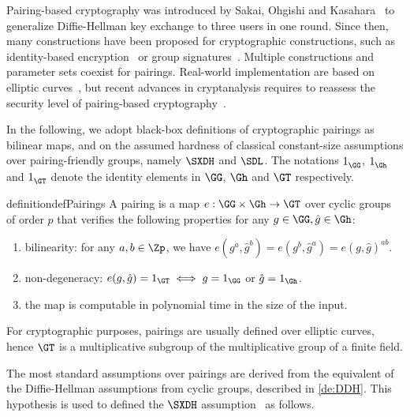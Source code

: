 
Pairing-based cryptography was introduced by Sakai, Ohgishi and Kasahara~\cite{SOK00} to generalize Diffie-Hellman key exchange to three users in one round.
Since then, many constructions have been proposed for cryptographic constructions, such as identity-based encryption~\cite{BF01,Wat05} or group signatures~\cite{BBS04}.
Multiple constructions and parameter sets coexist for pairings.
Real-world implementation are based on elliptic curves~\cite{BN06, KSS08}, but recent advances in cryptanalysis requires to reassess the security level of pairing-based cryptography~\cite{KB16,MSS17,BD18}.

In the following, we adopt black-box definitions of cryptographic pairings as bilinear maps, and on the assumed hardness of classical constant-size assumptions over pairing-friendly groups, namely $\SXDH$ and $\SDL$.
The notations $1_{\GG}^{}$, $1_{\Gh}^{}$ and $1_{\GT}^{}$ denote the identity elements in $\GG$, $\Gh$ and $\GT$ respectively.

\begin{restatable}{definition}{defPairings} \label{de:pairings} 
  A pairing is a map $e: \GG \times \Gh \to \GT$ over cyclic groups of order $p$ that verifies the following properties for any $g \in \GG, \hat{g} \in \Gh$:
  \begin{enumerate}[\quad (i)]
    \item bilinearity: for any $a, b \in \Zp$, we have $e(g^a, \hat{g}^b) = e(g^b, \hat{g}^a) = e(g, \hat{g})^{ab}$.
    \item non-degeneracy: $e(g,\hat{g}) = 1_{\GT} \iff g = 1_{\GG}$ or $\hat{g} = 1_{\Gh}$.
    \item the map is computable in polynomial time in the size of the input.
  \end{enumerate}
\end{restatable}

For cryptographic purposes, pairings are usually defined over elliptic curves, hence $\GT$ is a multiplicative subgroup of the multiplicative group of a finite field.

The most standard assumptions over pairings are derived from the equivalent of the Diffie-Hellman assumptions from cyclic groups,
described in \cref{de:DDH}.
This hypothesis is used to defined the $\SXDH$ assumption~\cite{Sco02} as follows.

